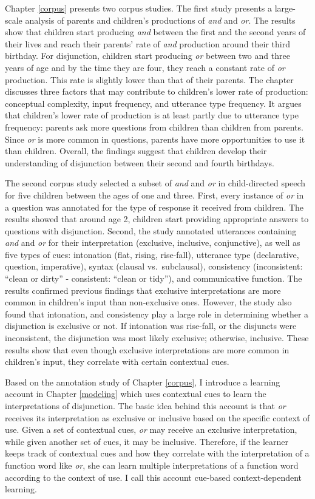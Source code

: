 \documentclass[oneside]{report}
\theoremstyle{definition}
\theoremstyle{definition}
\theoremstyle{definition}
\theoremstyle{remark}
\begin{document}
Chapter \ref{corpus} presents two corpus studies. The first study
presents a large-scale analysis of parents and children's productions of
\emph{and} and \emph{or}. The results show that children start producing
\emph{and} between the first and the second years of their lives and
reach their parents' rate of \emph{and} production around their third
birthday. For disjunction, children start producing \emph{or} between
two and three years of age and by the time they are four, they reach a
constant rate of \emph{or} production. This rate is slightly lower than
that of their parents. The chapter discusses three factors that may
contribute to children's lower rate of production: conceptual
complexity, input frequency, and utterance type frequency. It argues
that children's lower rate of production is at least partly due to
utterance type frequency: parents ask more questions from children than
children from parents. Since \emph{or} is more common in questions,
parents have more opportunities to use it than children. Overall, the
findings suggest that children develop their understanding of
disjunction between their second and fourth birthdays.

The second corpus study selected a subset of \emph{and} and \emph{or} in
child-directed speech for five children between the ages of one and
three. First, every instance of \emph{or} in a question was annotated
for the type of response it received from children. The results showed
that around age 2, children start providing appropriate answers to
questions with disjunction. Second, the study annotated utterances
containing \emph{and} and \emph{or} for their interpretation (exclusive,
inclusive, conjunctive), as well as five types of cues: intonation
(flat, rising, rise-fall), utterance type (declarative, question,
imperative), syntax (clausal vs.~subclausal), consistency (inconsistent:
``clean or dirty'' - consistent: ``clean or tidy''), and communicative
function. The results confirmed previous findings that exclusive
interpretations are more common in children's input than non-exclusive
ones. However, the study also found that intonation, and consistency
play a large role in determining whether a disjunction is exclusive or
not. If intonation was rise-fall, or the disjuncts were inconsistent,
the disjunction was most likely exclusive; otherwise, inclusive. These
results show that even though exclusive interpretations are more common
in children's input, they correlate with certain contextual cues.

Based on the annotation study of Chapter \ref{corpus}, I introduce a
learning account in Chapter \ref{modeling} which uses contextual cues to
learn the interpretations of disjunction. The basic idea behind this
account is that \emph{or} receives its interpretation as exclusive or
inclusive based on the specific context of use. Given a set of
contextual cues, \emph{or} may receive an exclusive interpretation,
while given another set of cues, it may be inclusive. Therefore, if the
learner keeps track of contextual cues and how they correlate with the
interpretation of a function word like \emph{or}, she can learn multiple
interpretations of a function word according to the context of use. I
call this account cue-based context-dependent learning.
\end{document}
